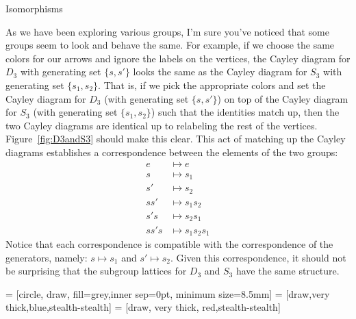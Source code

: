 \begin{section}{Isomorphisms}


As we have been exploring various groups, I'm sure you've noticed that some groups seem to look and behave the same.  For example, if we choose the same colors for our arrows and ignore the labels on the vertices, the Cayley diagram for $D_3$ with generating set $\{s,s'\}$ looks the same as the Cayley diagram for $S_3$ with generating set $\{s_1, s_2\}$. That is, if we pick the appropriate colors and set the Cayley diagram for $D_3$ (with generating set $\{s,s'\}$) on top of the Cayley diagram for $S_3$ (with generating set $\{s_1, s_2\}$) such that the identities match up, then the two Cayley diagrams are identical up to relabeling the rest of the vertices.  Figure~\ref{fig:D3andS3} should make this clear.  This act of matching up the Cayley diagrams establishes a correspondence between the elements of the two groups:
\begin{align*}
e & \mapsto e\\
s & \mapsto s_1\\
s' &\mapsto s_2\\
ss' &\mapsto s_1s_2\\
s's & \mapsto s_2s_1\\
ss's & \mapsto s_1s_2s_1
\end{align*}
Notice that each correspondence is compatible with the correspondence of the generators, namely: $s \mapsto s_1$ and $s' \mapsto s_2$. Given this correspondence, it should not be surprising that the subgroup lattices for $D_3$ and $S_3$ have the same structure.

 = [circle, draw, fill=grey,inner sep=0pt, minimum size=8.5mm]
 = [draw,very thick,blue,stealth-stealth]
 = [draw, very thick, red,stealth-stealth]


\end{section}
